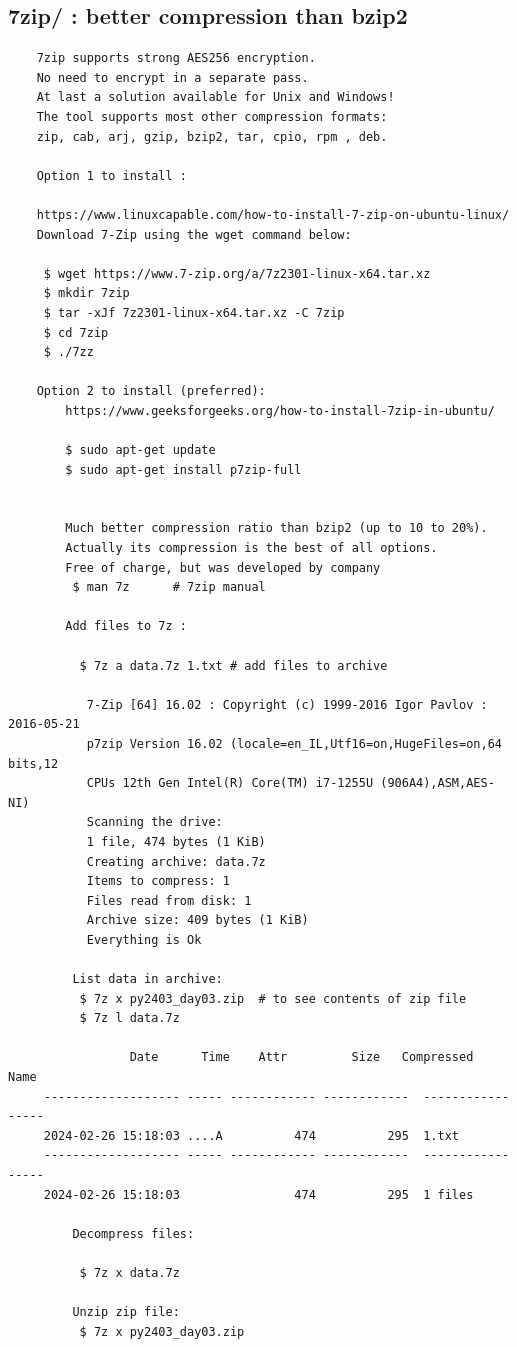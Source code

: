 \documentclass[a4paper,12pt]{article}
\begin{document}
\subsection{7zip/  : better compression than bzip2}
\begin{verbatim}
    7zip supports strong AES256 encryption.
    No need to encrypt in a separate pass.
    At last a solution available for Unix and Windows!
    The tool supports most other compression formats:
    zip, cab, arj, gzip, bzip2, tar, cpio, rpm , deb.
     
    Option 1 to install : 
        
    https://www.linuxcapable.com/how-to-install-7-zip-on-ubuntu-linux/
    Download 7-Zip using the wget command below:

     $ wget https://www.7-zip.org/a/7z2301-linux-x64.tar.xz  
     $ mkdir 7zip
     $ tar -xJf 7z2301-linux-x64.tar.xz -C 7zip
     $ cd 7zip
     $ ./7zz
     
    Option 2 to install (preferred): 
        https://www.geeksforgeeks.org/how-to-install-7zip-in-ubuntu/
        
        $ sudo apt-get update
        $ sudo apt-get install p7zip-full
        

        Much better compression ratio than bzip2 (up to 10 to 20%).
        Actually its compression is the best of all options.
        Free of charge, but was developed by company
         $ man 7z      # 7zip manual 
        
        Add files to 7z : 
        
          $ 7z a data.7z 1.txt # add files to archive
           
           7-Zip [64] 16.02 : Copyright (c) 1999-2016 Igor Pavlov : 2016-05-21
           p7zip Version 16.02 (locale=en_IL,Utf16=on,HugeFiles=on,64 bits,12      
           CPUs 12th Gen Intel(R) Core(TM) i7-1255U (906A4),ASM,AES-NI)
           Scanning the drive:
           1 file, 474 bytes (1 KiB)
           Creating archive: data.7z
           Items to compress: 1
           Files read from disk: 1
           Archive size: 409 bytes (1 KiB)
           Everything is Ok
         
         List data in archive:
          $ 7z x py2403_day03.zip  # to see contents of zip file
          $ 7z l data.7z

                 Date      Time    Attr         Size   Compressed  Name
     ------------------- ----- ------------ ------------  -----------------
     2024-02-26 15:18:03 ....A          474          295  1.txt
     ------------------- ----- ------------ ------------  -----------------
     2024-02-26 15:18:03                474          295  1 files

         Decompress files: 
          
          $ 7z x data.7z 
        
         Unzip zip file:  
          $ 7z x py2403_day03.zip
          
\end{verbatim}
\end{document}
